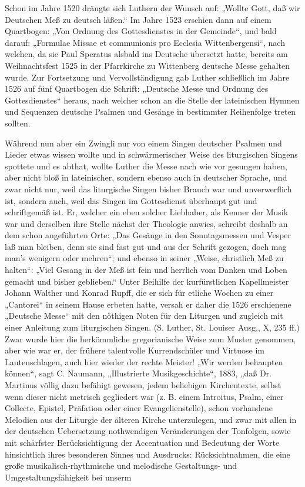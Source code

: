 Schon im Jahre 1520 drängte sich Luthern der Wunsch auf: „Wollte Gott, daß wir Deutschen Meß zu deutsch läßen.“ Im Jahre 1523 erschien dann auf einem Quartbogen: „Von Ordnung des Gottesdienstes in der Gemeinde“, und bald darauf: „Formulae Missae et communionis pro Ecclesia Wittenbergensi“, nach welchen, da sie Paul Speratus alsbald ins Deutsche übersetzt
hatte, bereits am Weihnachtsfest 1525 in der Pfarrkirche zu Wittenberg deutsche Messe gehalten wurde. Zur Fortsetzung und Vervollständigung gab Luther schließlich im Jahre 1526 auf fünf Quartbogen die Schrift: „Deutsche Messe und Ordnung des Gottesdienstes“ heraus, nach welcher schon an die Stelle der lateinischen Hymnen und Sequenzen deutsche Psalmen und Gesänge in bestimmter Reihenfolge treten sollten.

Während nun aber ein Zwingli nur von einem Singen deutscher Psalmen und Lieder etwas wissen wollte und in schwärmerischer Weise des liturgischen Singens spottete und es abthat, wollte Luther die Messe nach wie vor gesungen haben, aber nicht bloß in lateinischer, sondern ebenso auch in deutscher Sprache, und zwar nicht nur, weil das liturgische Singen bisher Brauch war und unverwerflich ist, sondern auch, weil das Singen im Gottesdienst überhaupt gut und schriftgemäß ist. Er, welcher ein eben solcher Liebhaber, als Kenner der Musik war und derselben ihre Stelle nächst der Theologie anwies, schreibt deshalb an dem schon angeführten Orte: „Das Gesänge in den Sonntagsmessen und Vesper laß man bleiben, denn sie sind fast gut und aus der Schrift gezogen, doch mag man’s wenigern oder mehren“; und ebenso in seiner „Weise, christlich Meß zu halten“: „Viel Gesang in der Meß ist fein und herrlich vom Danken und Loben gemacht und bisher geblieben.“ Unter Beihilfe der kurfürstlichen Kapellmeister Johann Walther und Konrad Rupff, die er sich für etliche Wochen zu einer „Cantorei“ in seinem Hause erbeten hatte, versah er daher die 1526 erschienene „Deutsche Messe“ mit den nöthigen Noten für den Liturgen und zugleich mit einer Anleitung zum liturgischen Singen. (S. Luther, St. Louiser Ausg., X, 235 ff.) Zwar wurde hier die herkömmliche gregorianische Weise zum Muster genommen, aber wie war er, der frühere talentvolle Kurrendschüler und Virtuose im Lautenschlagen, auch hier wieder der rechte Meister! „Wir werden behaupten können“, sagt C. Naumann, „Illustrierte Musikgeschichte“, 1883, „daß Dr. Martinus völlig dazu befähigt gewesen, jedem beliebigen Kirchentexte, selbst wenn dieser nicht metrisch gegliedert war (z. B. einem Introitus, Psalm, einer Collecte, Epistel, Präfation oder einer Evangelienstelle), schon vorhandene Melodien aus der Liturgie der älteren Kirche unterzulegen, und zwar mit allen in der deutschen Uebersetzung nothwendigen Veränderungen der Tonfolgen, sowie mit schärfster Berücksichtigung der Accentuation und Bedeutung der Worte hinsichtlich ihres besonderen Sinnes und Ausdrucks: Rücksichtnahmen, die eine große musikalisch-rhythmische und melodische Gestaltungs- und Umgestaltungsfähigkeit bei unserm
